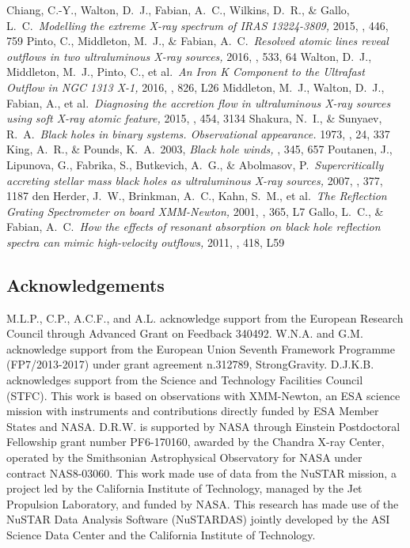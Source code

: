 \documentclass[10pt, a4paper]{article}
\begin{document}
\begin{thebibliography}{1}
 Chiang, C.-Y., Walton, D.~J., Fabian, A.~C., Wilkins, D.~R., \& Gallo, L.~C.\ \emph{Modelling the extreme X-ray spectrum of IRAS 13224-3809,} 2015, \mnras, 446, 759 
 Pinto, C., Middleton, M.~J., \& Fabian, A.~C.\ \emph{Resolved atomic lines reveal outflows in two ultraluminous X-ray sources,} 2016, \nat, 533, 64
 Walton, D.~J., Middleton, M.~J., Pinto, C., et al.\ \emph{An Iron K Component to the Ultrafast Outflow in NGC 1313 X-1,} 2016, \apjl, 826, L26 
 Middleton, M.~J., Walton, D.~J., Fabian, A., et al.\ \emph{Diagnosing the accretion flow in ultraluminous X-ray sources using soft X-ray atomic feature,} 2015, \mnras, 454, 3134 
 Shakura, N.~I., \& Sunyaev, R.~A.\ \emph{Black holes in binary systems. Observational appearance.} 1973, \aap, 24, 337 
 King, A.~R., \& Pounds, K.~A.\ 2003, \emph{Black hole winds,} \mnras, 345, 657 
 Poutanen, J., Lipunova, G., Fabrika, S., Butkevich, A.~G., \& Abolmasov, P.\ \emph{Supercritically accreting stellar mass black holes as ultraluminous X-ray sources,} 2007, \mnras, 377, 1187 
 den Herder, J.~W., Brinkman, A.~C., Kahn, S.~M., et al.\ \emph{The Reflection Grating Spectrometer on board XMM-Newton,} 2001, \aap, 365, L7 
 Gallo, L.~C., \& Fabian, A.~C.\ \emph{How the effects of resonant absorption on black hole reflection spectra can mimic high-velocity outflows,} 2011, \mnras, 418, L59 

\end{thebibliography}

\subsection*{Acknowledgements}
M.L.P., C.P., A.C.F., and A.L. acknowledge support from the European Research Council through Advanced Grant on Feedback 340492. 
W.N.A. and G.M. acknowledge support from the European Union Seventh Framework Programme (FP7/2013-2017) under grant agreement n.312789, StrongGravity. 
D.J.K.B. acknowledges support from the Science and Technology Facilities Council (STFC). This work
is based on observations with XMM-Newton, an ESA science mission with instruments and contributions directly funded by ESA Member States and NASA.
D.R.W. is supported by NASA through Einstein Postdoctoral Fellowship grant number PF6-170160, awarded by the Chandra X-ray Center, operated by the Smithsonian Astrophysical Observatory for NASA under contract NAS8-03060.
This work made use of data from the
NuSTAR mission, a project led by the California Institute of
Technology, managed by the Jet Propulsion Laboratory, and
funded by NASA. This research has made use of the NuSTAR
Data Analysis Software (NuSTARDAS) jointly developed by
the ASI Science Data Center and the California Institute of
Technology.
\end{document}
